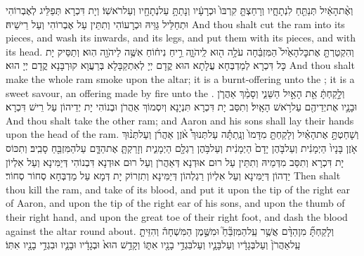 {וְאֶ֨ת\maqqaf הָאַ֔יִל תְּנַתֵּ֖חַ לִנְתָחָ֑יו וְרָחַצְתָּ֤ קִרְבּוֹ֙ וּכְרָעָ֔יו וְנָתַתָּ֥ עַל\maqqaf נְתָחָ֖יו וְעַל\maqqaf רֹאשֽׁוֹ׃}
{וְיָת דִּכְרָא תְּפַלֵּיג לְאֶבְרוֹהִי וּתְחַלֵּיל גַּוֵּיהּ וּכְרָעוֹהִי וְתִתֵּין עַל אֶבְרוֹהִי וְעַל רֵישֵׁיהּ׃}
{And thou shalt cut the ram into its pieces, and wash its inwards, and its legs, and put them with its pieces, and with its head.}{}
{וְהִקְטַרְתָּ֤ אֶת\maqqaf כׇּל\maqqaf הָאַ֙יִל֙ הַמִּזְבֵּ֔חָה עֹלָ֥ה ה֖וּא לַֽיהֹוָ֑ה רֵ֣יחַ נִיח֔וֹחַ אִשֶּׁ֥ה לַיהֹוָ֖ה הֽוּא׃}
{וְתַסֵּיק יָת כָּל דִּכְרָא לְמַדְבְּחָא עֲלָתָא הוּא קֳדָם יְיָ לְאִתְקַבָּלָא בְּרַעֲוָא קוּרְבָּנָא קֳדָם יְיָ הוּא׃}
{And thou shalt make the whole ram smoke upon the altar; it is a burnt-offering unto the \lord; it is a sweet savour, an offering made by fire unto the \lord.}{}
{וְלָ֣קַחְתָּ֔ אֵ֖ת הָאַ֣יִל הַשֵּׁנִ֑י וְסָמַ֨ךְ אַהֲרֹ֧ן וּבָנָ֛יו אֶת\maqqaf יְדֵיהֶ֖ם עַל\maqqaf רֹ֥אשׁ הָאָֽיִל׃}
{וְתִסַּב יָת דִּכְרָא תִּנְיָנָא וְיִסְמוֹךְ אַהֲרֹן וּבְנוֹהִי יָת יְדֵיהוֹן עַל רֵישׁ דִּכְרָא׃}
{And thou shalt take the other ram; and Aaron and his sons shall lay their hands upon the head of the ram.}{}
{וְשָׁחַטְתָּ֣ אֶת\maqqaf הָאַ֗יִל וְלָקַחְתָּ֤ מִדָּמוֹ֙ וְנָֽתַתָּ֡ה עַל\maqqaf תְּנוּךְ֩ אֹ֨זֶן אַהֲרֹ֜ן וְעַל\maqqaf תְּנ֨וּךְ אֹ֤זֶן בָּנָיו֙ הַיְמָנִ֔ית וְעַל\maqqaf בֹּ֤הֶן יָדָם֙ הַיְמָנִ֔ית וְעַל\maqqaf בֹּ֥הֶן רַגְלָ֖ם הַיְמָנִ֑ית וְזָרַקְתָּ֧ אֶת\maqqaf הַדָּ֛ם עַל\maqqaf הַמִּזְבֵּ֖חַ סָבִֽיב׃}
{וְתִכּוֹס יָת דִּכְרָא וְתִסַּב מִדְּמֵיהּ וְתִתֵּין עַל רוּם אוּדְנָא דְּאַהֲרֹן וְעַל רוּם אוּדְנָא דִּבְנוֹהִי דְּיַמִּינָא וְעַל אִלְיוֹן יַדְהוֹן דְּיַמִּינָא וְעַל אִלְיוֹן רַגְלְהוֹן דְּיַמִּינָא וְתִזְרוֹק יָת דְּמָא עַל מַדְבְּחָא סְחוֹר סְחוֹר׃}
{Then shalt thou kill the ram, and take of its blood, and put it upon the tip of the right ear of Aaron, and upon the tip of the right ear of his sons, and upon the thumb of their right hand, and upon the great toe of their right foot, and dash the blood against the altar round about.}{}
{וְלָקַחְתָּ֞ מִן\maqqaf הַדָּ֨ם אֲשֶׁ֥ר עַֽל\maqqaf הַמִּזְבֵּ֘חַ֮ וּמִשֶּׁ֣מֶן הַמִּשְׁחָה֒ וְהִזֵּיתָ֤ עַֽל\maqqaf אַהֲרֹן֙ וְעַל\maqqaf בְּגָדָ֔יו וְעַל\maqqaf בָּנָ֛יו וְעַל\maqqaf בִּגְדֵ֥י בָנָ֖יו אִתּ֑וֹ וְקָדַ֥שׁ הוּא֙ וּבְגָדָ֔יו וּבָנָ֛יו וּבִגְדֵ֥י בָנָ֖יו אִתּֽוֹ׃}
